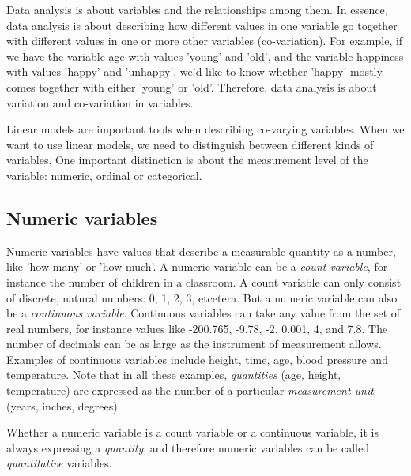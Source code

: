 Data analysis is about variables and the relationships among them. In essence, data analysis is about describing how different values in one variable go together with different values in one or more other variables (co-variation). For example, if we have the variable age with values 'young' and 'old', and the variable happiness with values 'happy' and 'unhappy', we'd like to know whether 'happy' mostly comes together with either 'young' or 'old'. Therefore, data analysis is about variation and co-variation in variables.

Linear models are important tools when describing co-varying variables. When we want to use linear models, we need to distinguish between different kinds of variables. One important distinction is about the measurement level of the variable: numeric, ordinal or categorical.


\subsection{Numeric variables}

Numeric variables have values that describe a measurable quantity as a number, like 'how many' or 'how much'. A numeric variable can be a \textit{count variable}, for instance the number of children in a classroom. A count variable can only consist of discrete, natural numbers: 0, 1, 2, 3, etcetera. But a numeric variable can also be a \textit{continuous variable}. Continuous variables can take any value from the set of real numbers, for instance values like -200.765, -9.78, -2, 0.001, 4, and 7.8. The number of decimals can be as large as the instrument of measurement allows. Examples of continuous variables include height, time, age, blood pressure and temperature. Note that in all these examples, \textit{quantities} (age, height, temperature) are expressed as the number of a particular \textit{measurement unit} (years, inches, degrees).

Whether a numeric variable is a count variable or a continuous variable, it is always expressing a \textit{quantity}, and therefore numeric variables can be called \textit{quantitative} variables.




